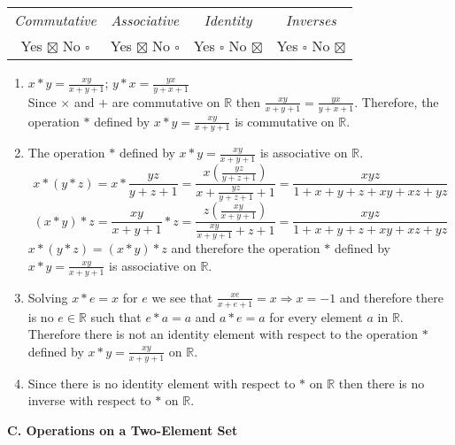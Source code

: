 \documentclass[12pt]{article}
\begin{document}
\begin{enumerate}
\begin{tabular}{c c c c}
							\textit{Commutative} & \textit{Associative} & \textit{Identity} & \textit{Inverses} \\
								Yes $\boxtimes$ No $\square$ & Yes $\boxtimes$ No $\square$ & Yes $\square$ No $\boxtimes$ & Yes $\square$ No $\boxtimes$ \\
						\end{tabular}
						\begin{enumerate}
							\item $x * y = \frac{xy}{x+y+1} $;
								$ y * x = \frac{yx}{y+x+1}$ \\
								Since $\times$ and $+$ are commutative on $\mathbb{R}$ then $\frac{xy}{x+y+1} = \frac{yx}{y+x+1}$. 
								Therefore, the operation $*$ defined by $x * y = \frac{xy}{x + y + 1}$ is commutative on $\mathbb{R}$.
							\item The operation $*$ defined by $x * y = \frac{xy}{x + y + 1}$ is associative on $\mathbb{R}$. \\
								$$x * (y *z) = x * \frac{yz}{y + z +1} = \frac{x\left( \frac{yz}{y+z+1} \right)}{x + \frac{yz}{y+z+1} + 1} = \frac{xyz}{1 + x + y + z + xy + xz +yz}$$
								$$(x * y) * z = \frac{xy}{x + y +1} * z = \frac{z\left( \frac{xy}{x+y+1} \right)}{\frac{xy}{x+y+1} + z + 1} = \frac{xyz}{1 + x + y + z + xy + xz +yz}$$
								$x * (y * z) = (x * y) * z$ and therefore the operation $*$ defined by $x * y = \frac{xy}{x + y + 1}$ is associative on $\mathbb{R}$.
							\item Solving $x*e = x$ for $e$ we see that $\frac{xe}{x + e +1} = x \Rightarrow x = -1$ and therefore there is 
								no $e \in \mathbb{R}$ such that $e * a = a$ and $a * e = a$ for every element $a$ in $\mathbb{R}$. Therefore 
								there is not an identity element with respect to the operation $*$ defined by $x * y = \frac{xy}{x + y + 1}$ on $\mathbb{R}$.
							\item Since there is no identity element with respect to $*$ on $\mathbb{R}$ then there is no inverse with respect to $*$ on $\mathbb{R}$.
						\end{enumerate}
					\end{enumerate}
					

\noindent\textbf{C. Operations on a Two-Element Set} \smallskip
\end{document}
